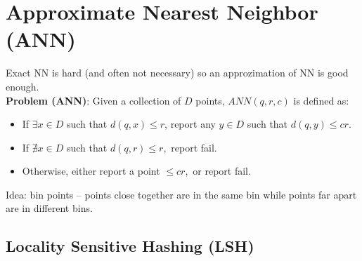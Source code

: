 \documentclass[12pt]{article}
\begin{document}
\MakeScribeTop

\section{Approximate Nearest Neighbor (ANN)}


Exact NN is hard (and often not necessary) so an approzimation of NN is good enough.\\

\textbf{Problem (ANN)}: Given a collection of $D$ points, $ANN(q, r, c)$ is defined as:
\begin{itemize}
  \item If $\exists x \in D$ such that $d(q, x) \leq r$, report any $y \in D$ such that $d(q, y) \leq cr.$
  \item If $\nexists x \in D$ such that $d(q, r) \leq r,$ report fail.
  \item Otherwise, either report a point $\leq cr,$ or report fail.
\end{itemize}

Idea: bin points -- points close together are in the same bin while points far apart are in different bins.

\newcommand{\expected}{\mathbb{E}}
\newcommand{\probab}{\mathbb{P}}

\subsection{Locality Sensitive Hashing (LSH)}
\end{document}
